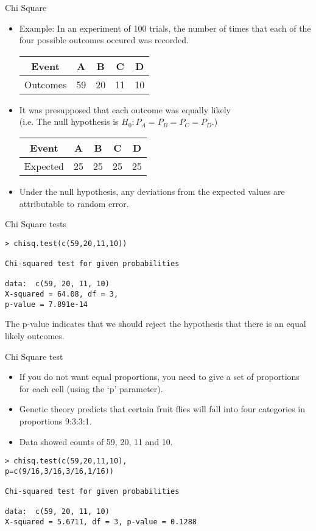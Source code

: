 \documentclass[a4paper,12pt]{article}
\begin{document}
{Chi Square}
\begin{itemize}
	\item Example: In an experiment of 100 trials, the number of times that each of the four possible outcomes
	occured was recorded.\\
	\begin{tabular}{|c|c|c|c|c|}
		\hline
		Event & A & B & C & D \\\hline
		Outcomes & 59 & 20 & 11 & 10 \\
		\hline
	\end{tabular}
	
	\item It was presupposed that each outcome was equally likely \\(i.e. The null hypothesis is $H_{0} : P_{A} = P_{B} = P_{C} = P_{D}$.)\\
	\begin{tabular}{|c|c|c|c|c|}
		\hline
		Event & A & B & C & D \\\hline
		Expected & 25 & 25 & 25 & 25 \\
		\hline
	\end{tabular}
	\item Under the null hypothesis, any deviations from the expected values are attributable to random error.
	
\end{itemize}

{Chi Square tests}


\begin{verbatim}
> chisq.test(c(59,20,11,10))

Chi-squared test for given probabilities

data:  c(59, 20, 11, 10)
X-squared = 64.08, df = 3,
p-value = 7.891e-14
\end{verbatim}

The p-value indicates that we should reject the hypothesis that there is an equal likely outcomes.


{Chi Square test}
\begin{itemize}
	\item If you do not want equal proportions, you need to give a set of
	proportions for each cell (using the `p' parameter).
	\item Genetic theory predicts that certain fruit flies
	will fall into four categories in proportions 9:3:3:1.
	\item Data showed counts of 59, 20, 11 and 10.
\end{itemize}
\begin{verbatim}
> chisq.test(c(59,20,11,10),
p=c(9/16,3/16,3/16,1/16))

Chi-squared test for given probabilities

data:  c(59, 20, 11, 10)
X-squared = 5.6711, df = 3, p-value = 0.1288
\end{verbatim}
\end{document}
